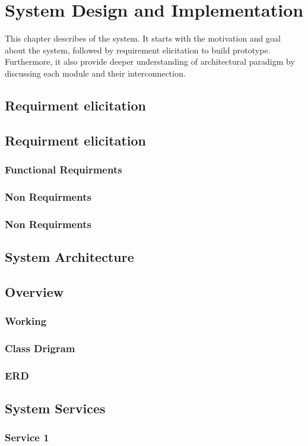\chapter{System Design and Implementation}

This chapter describes of the system. It starts with the motivation and goal about the system, followed by requirement elicitation to build prototype. Furthermore, it also provide deeper understanding of architectural paradigm by discussing each module and their interconnection.

\section{Requirment elicitation}

\section{Requirment elicitation}
\subsection{Functional Requirments}
\subsection{Non Requirments}
\subsection{Non Requirments}

\section{System Architecture}

\section{Overview}

\subsection{Working}

\subsection{Class Drigram}

\subsection{ERD}

\section{System Services}

\subsection{Service 1}
